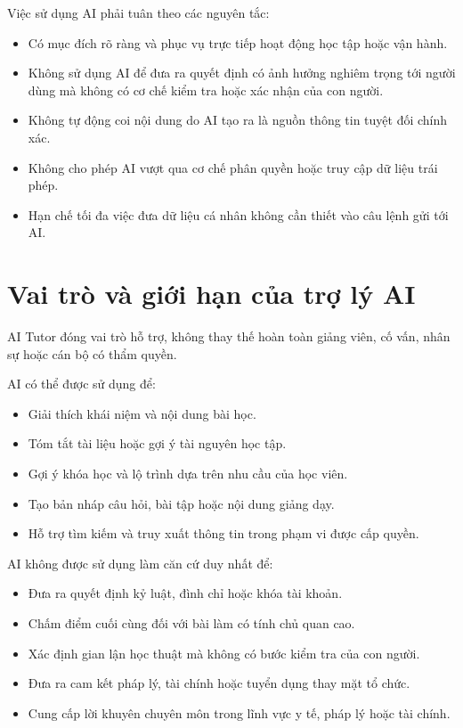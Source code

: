 \documentclass[12pt,a4paper]{article}
\begin{document}
Việc sử dụng AI phải tuân theo các nguyên tắc:

\begin{itemize}
    \item Có mục đích rõ ràng và phục vụ trực tiếp hoạt động học tập hoặc vận hành.
    \item Không sử dụng AI để đưa ra quyết định có ảnh hưởng nghiêm trọng tới người dùng
    mà không có cơ chế kiểm tra hoặc xác nhận của con người.
    \item Không tự động coi nội dung do AI tạo ra là nguồn thông tin tuyệt đối chính xác.
    \item Không cho phép AI vượt qua cơ chế phân quyền hoặc truy cập dữ liệu trái phép.
    \item Hạn chế tối đa việc đưa dữ liệu cá nhân không cần thiết vào câu lệnh gửi tới AI.
\end{itemize}

\section{Vai trò và giới hạn của trợ lý AI}

AI Tutor đóng vai trò hỗ trợ, không thay thế hoàn toàn giảng viên, cố vấn,
nhân sự hoặc cán bộ có thẩm quyền.

AI có thể được sử dụng để:

\begin{itemize}
    \item Giải thích khái niệm và nội dung bài học.
    \item Tóm tắt tài liệu hoặc gợi ý tài nguyên học tập.
    \item Gợi ý khóa học và lộ trình dựa trên nhu cầu của học viên.
    \item Tạo bản nháp câu hỏi, bài tập hoặc nội dung giảng dạy.
    \item Hỗ trợ tìm kiếm và truy xuất thông tin trong phạm vi được cấp quyền.
\end{itemize}

AI không được sử dụng làm căn cứ duy nhất để:

\begin{itemize}
    \item Đưa ra quyết định kỷ luật, đình chỉ hoặc khóa tài khoản.
    \item Chấm điểm cuối cùng đối với bài làm có tính chủ quan cao.
    \item Xác định gian lận học thuật mà không có bước kiểm tra của con người.
    \item Đưa ra cam kết pháp lý, tài chính hoặc tuyển dụng thay mặt tổ chức.
    \item Cung cấp lời khuyên chuyên môn trong lĩnh vực y tế, pháp lý hoặc tài chính.
\end{itemize}
\end{document}
